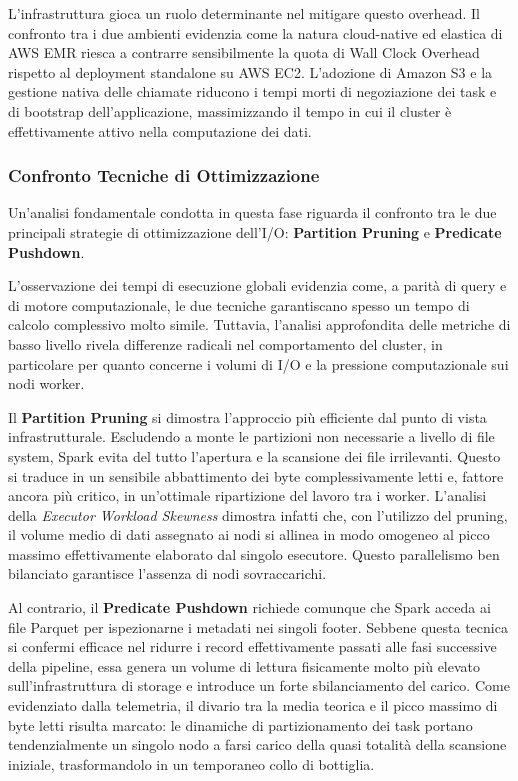 \documentclass[conference]{IEEEtran}
\begin{document}
L'infrastruttura gioca un ruolo determinante nel mitigare questo overhead.
Il confronto tra i due ambienti evidenzia come la natura cloud-native ed elastica di AWS EMR riesca a contrarre sensibilmente la quota di Wall Clock Overhead rispetto al deployment standalone su AWS EC2. L'adozione di Amazon S3 e la gestione nativa delle chiamate riducono i tempi morti di negoziazione dei task e di bootstrap dell'applicazione, massimizzando il tempo in cui il cluster è effettivamente attivo nella computazione dei dati.

\subsubsection{Confronto Tecniche di Ottimizzazione}
Un'analisi fondamentale condotta in questa fase riguarda il confronto tra le due principali strategie di ottimizzazione dell'I/O: \textbf{Partition Pruning} e \textbf{Predicate Pushdown}.

L'osservazione dei tempi di esecuzione globali evidenzia come, a parità di query e di motore computazionale, le due tecniche garantiscano spesso un tempo di calcolo complessivo molto simile.
Tuttavia, l'analisi approfondita delle metriche di basso livello rivela differenze radicali nel comportamento del cluster, in particolare per quanto concerne i volumi di I/O e la pressione computazionale sui nodi worker.

Il \textbf{Partition Pruning} si dimostra l'approccio più efficiente dal punto di vista infrastrutturale.
Escludendo a monte le partizioni non necessarie a livello di file system, Spark evita del tutto l'apertura e la scansione dei file irrilevanti.
Questo si traduce in un sensibile abbattimento dei byte complessivamente letti e, fattore ancora più critico, in un'ottimale ripartizione del lavoro tra i worker.
L'analisi della \textit{Executor Workload Skewness} dimostra infatti che, con l'utilizzo del pruning, il volume medio di dati assegnato ai nodi si allinea in modo omogeneo al picco massimo effettivamente elaborato dal singolo esecutore.
Questo parallelismo ben bilanciato garantisce l'assenza di nodi sovraccarichi.

Al contrario, il \textbf{Predicate Pushdown} richiede comunque che Spark acceda ai file Parquet per ispezionarne i metadati nei singoli footer.
Sebbene questa tecnica si confermi efficace nel ridurre i record effettivamente passati alle fasi successive della pipeline, essa genera un volume di lettura fisicamente molto più elevato sull'infrastruttura di storage e introduce un forte sbilanciamento del carico.
Come evidenziato dalla telemetria, il divario tra la media teorica e il picco massimo di byte letti risulta marcato: le dinamiche di partizionamento dei task portano tendenzialmente un singolo nodo a farsi carico della quasi totalità della scansione iniziale, trasformandolo in un temporaneo collo di bottiglia.
\end{document}
